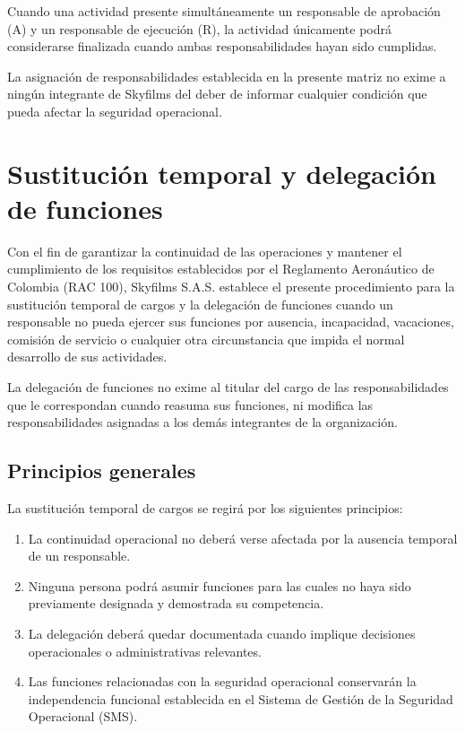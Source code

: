\begin{tcolorbox}[title=Interpretación de la matriz]

Cuando una actividad presente simultáneamente un responsable de aprobación (A) y un responsable de ejecución (R), la actividad únicamente podrá considerarse finalizada cuando ambas responsabilidades hayan sido cumplidas.

La asignación de responsabilidades establecida en la presente matriz no exime a ningún integrante de Skyfilms del deber de informar cualquier condición que pueda afectar la seguridad operacional.

\end{tcolorbox}


\section{Sustitución temporal y delegación de funciones}

Con el fin de garantizar la continuidad de las operaciones y mantener el cumplimiento de los requisitos establecidos por el Reglamento Aeronáutico de Colombia (RAC 100), Skyfilms S.A.S. establece el presente procedimiento para la sustitución temporal de cargos y la delegación de funciones cuando un responsable no pueda ejercer sus funciones por ausencia, incapacidad, vacaciones, comisión de servicio o cualquier otra circunstancia que impida el normal desarrollo de sus actividades.

La delegación de funciones no exime al titular del cargo de las responsabilidades que le correspondan cuando reasuma sus funciones, ni modifica las responsabilidades asignadas a los demás integrantes de la organización.


\subsection*{Principios generales}

La sustitución temporal de cargos se regirá por los siguientes principios:

\begin{enumerate}[label=\alph*)]

\item La continuidad operacional no deberá verse afectada por la ausencia temporal de un responsable.

\item Ninguna persona podrá asumir funciones para las cuales no haya sido previamente designada y demostrada su competencia.

\item La delegación deberá quedar documentada cuando implique decisiones operacionales o administrativas relevantes.

\item Las funciones relacionadas con la seguridad operacional conservarán la independencia funcional establecida en el Sistema de Gestión de la Seguridad Operacional (SMS).

\end{enumerate}

